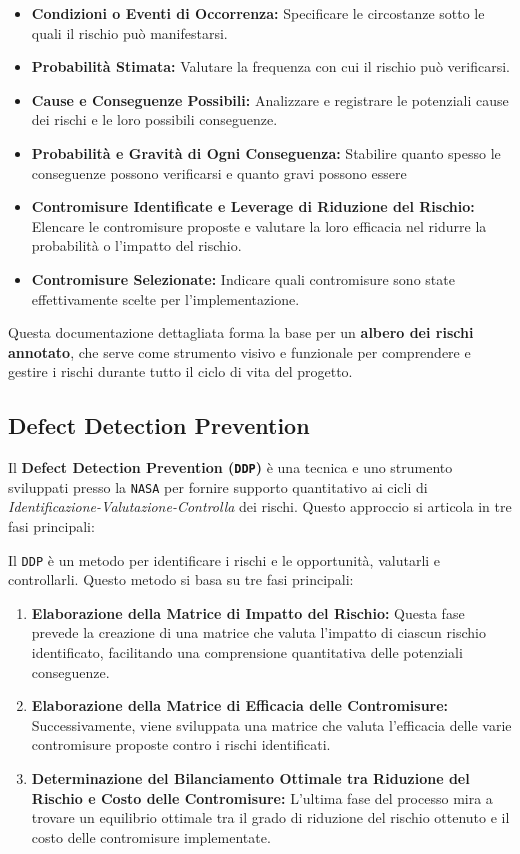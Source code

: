 \begin{itemize}
    \item \textbf{Condizioni o Eventi di Occorrenza:} Specificare le circostanze sotto le
    quali il rischio può manifestarsi.
    \item \textbf{Probabilità Stimata:} Valutare la frequenza con cui il rischio può
    verificarsi.
    \item \textbf{Cause e Conseguenze Possibili:} Analizzare e registrare le potenziali
    cause dei rischi e le loro possibili conseguenze.
    \item \textbf{Probabilità e Gravità di Ogni Conseguenza:} Stabilire quanto spesso le
    conseguenze possono verificarsi e quanto gravi possono essere
    \item \textbf{Contromisure Identificate e Leverage di Riduzione del Rischio:} Elencare
    le contromisure proposte e valutare la loro efficacia nel ridurre la probabilità o
    l'impatto del rischio.
    \item \textbf{Contromisure Selezionate:} Indicare quali contromisure sono state
    effettivamente scelte per l'implementazione.
\end{itemize}

Questa documentazione dettagliata forma la base per un \textbf{albero dei rischi annotato},
che serve come strumento visivo e funzionale per comprendere e gestire i rischi durante
tutto il ciclo di vita del progetto.

\subsection{Defect Detection Prevention}
Il \textbf{Defect Detection Prevention (\texttt{DDP})} è una tecnica e uno strumento
sviluppati presso la \texttt{NASA} per fornire supporto quantitativo ai cicli di
\textit{Identificazione-Valutazione-Controlla} dei rischi. Questo approccio si
articola in tre fasi principali:

Il \texttt{DDP} è un metodo per identificare i rischi e le opportunità,
valutarli e controllarli. Questo metodo si basa su tre fasi principali:

\begin{enumerate}
    \item \textbf{Elaborazione della Matrice di Impatto del Rischio:} Questa
    fase prevede la creazione di una matrice che valuta l'impatto di ciascun
    rischio identificato, facilitando una comprensione quantitativa delle
    potenziali conseguenze.
    
    \item \textbf{Elaborazione della Matrice di Efficacia delle Contromisure:}
    Successivamente, viene sviluppata una matrice che valuta l'efficacia delle
    varie contromisure proposte contro i rischi identificati.
    
    \item \textbf{Determinazione del Bilanciamento Ottimale tra Riduzione del Rischio
    e Costo delle Contromisure:} L'ultima fase del processo mira a trovare un equilibrio
    ottimale tra il grado di riduzione del rischio ottenuto e il costo delle contromisure
    implementate.
\end{enumerate}

